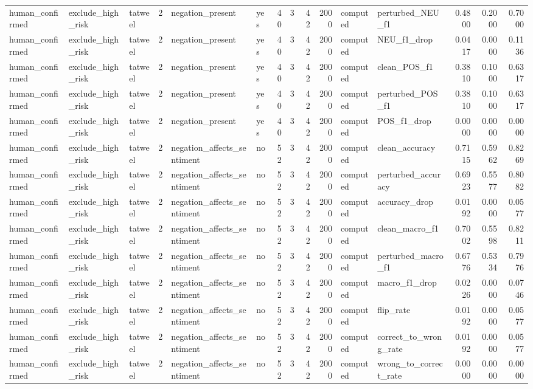 \begin{tabular}{lllrllrrrrllrrr}
human_confirmed & exclude_high_risk & tatweel & 2 & negation_present & yes & 40 & 3 & 42 & 2000 & computed & perturbed_NEU_f1 & 0.4800 & 0.2000 & 0.7000 \\
human_confirmed & exclude_high_risk & tatweel & 2 & negation_present & yes & 40 & 3 & 42 & 2000 & computed & NEU_f1_drop & 0.0417 & 0.0000 & 0.1136 \\
human_confirmed & exclude_high_risk & tatweel & 2 & negation_present & yes & 40 & 3 & 42 & 2000 & computed & clean_POS_f1 & 0.3810 & 0.1000 & 0.6317 \\
human_confirmed & exclude_high_risk & tatweel & 2 & negation_present & yes & 40 & 3 & 42 & 2000 & computed & perturbed_POS_f1 & 0.3810 & 0.1000 & 0.6317 \\
human_confirmed & exclude_high_risk & tatweel & 2 & negation_present & yes & 40 & 3 & 42 & 2000 & computed & POS_f1_drop & 0.0000 & 0.0000 & 0.0000 \\
human_confirmed & exclude_high_risk & tatweel & 2 & negation_affects_sentiment & no & 52 & 3 & 42 & 2000 & computed & clean_accuracy & 0.7115 & 0.5962 & 0.8269 \\
human_confirmed & exclude_high_risk & tatweel & 2 & negation_affects_sentiment & no & 52 & 3 & 42 & 2000 & computed & perturbed_accuracy & 0.6923 & 0.5577 & 0.8082 \\
human_confirmed & exclude_high_risk & tatweel & 2 & negation_affects_sentiment & no & 52 & 3 & 42 & 2000 & computed & accuracy_drop & 0.0192 & 0.0000 & 0.0577 \\
human_confirmed & exclude_high_risk & tatweel & 2 & negation_affects_sentiment & no & 52 & 3 & 42 & 2000 & computed & clean_macro_f1 & 0.7002 & 0.5598 & 0.8211 \\
human_confirmed & exclude_high_risk & tatweel & 2 & negation_affects_sentiment & no & 52 & 3 & 42 & 2000 & computed & perturbed_macro_f1 & 0.6776 & 0.5334 & 0.7976 \\
human_confirmed & exclude_high_risk & tatweel & 2 & negation_affects_sentiment & no & 52 & 3 & 42 & 2000 & computed & macro_f1_drop & 0.0226 & 0.0000 & 0.0746 \\
human_confirmed & exclude_high_risk & tatweel & 2 & negation_affects_sentiment & no & 52 & 3 & 42 & 2000 & computed & flip_rate & 0.0192 & 0.0000 & 0.0577 \\
human_confirmed & exclude_high_risk & tatweel & 2 & negation_affects_sentiment & no & 52 & 3 & 42 & 2000 & computed & correct_to_wrong_rate & 0.0192 & 0.0000 & 0.0577 \\
human_confirmed & exclude_high_risk & tatweel & 2 & negation_affects_sentiment & no & 52 & 3 & 42 & 2000 & computed & wrong_to_correct_rate & 0.0000 & 0.0000 & 0.0000 \\

\end{tabular}
